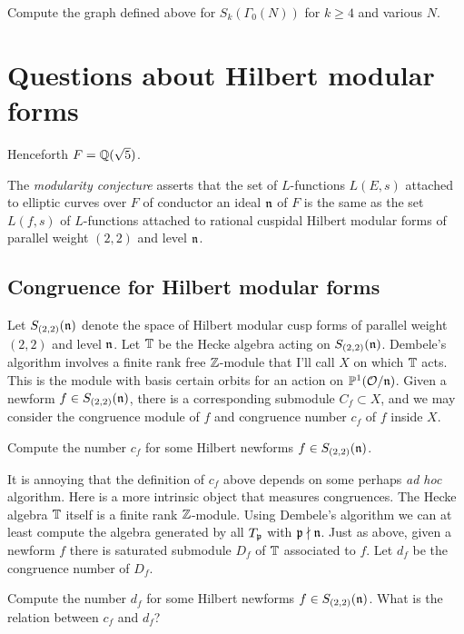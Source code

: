 \documentclass{article}
\begin{document}
\vspace{1em}
 Compute the graph defined above for
$S_k(\Gamma_0(N))$ for $k\geq 4$ and various $N$.


\section{Questions about Hilbert modular forms}

Henceforth $F=\mathbb{Q}(\sqrt{5})$.

The {\em modularity conjecture} asserts that the set of $L$-functions
$L(E,s)$ attached to elliptic curves over $F$ of conductor an ideal
$\mathfrak{n}$ of $F$ is the same as the set $L(f,s)$ of $L$-functions attached
to rational cuspidal Hilbert modular forms of parallel weight $(2,2)$
and level $\mathfrak{n}$.



\subsection{Congruence for Hilbert modular forms}

Let $S_{(2,2)}(\mathfrak{n})$ denote the space of Hilbert modular cusp forms of
parallel weight $(2,2)$ and level $\mathfrak{n}$.  Let $\mathbb{T}$ be the Hecke algebra
acting on $S_{(2,2)}(\mathfrak{n})$.   Dembele's algorithm involves a finite
rank free $\mathbb{Z}$-module that I'll call $X$ on which $\mathbb{T}$ acts. 
This is the module with basis certain orbits for an action on $\mathbb{P}^1(\mathcal{O}/\mathfrak{n})$.
Given a newform $f\in S_{(2,2)}(\mathfrak{n})$, there is a corresponding
submodule $C_f \subset X$, and we may consider the congruence module
of $f$ 
and congruence number $c_f$ of $f$ inside $X$.

\vspace{1em}
 Compute the number $c_f$ for some Hilbert
newforms $f \in S_{(2,2)}(\mathfrak{n})$.


It is annoying that the definition of $c_f$ above depends on some
perhaps {\em ad hoc} algorithm.  Here is a more intrinsic object that
measures congruences.  The Hecke algebra $\mathbb{T}$ itself is a finite rank
$\mathbb{Z}$-module.  Using Dembele's algorithm we can at least compute the
algebra generated by all $T_{\mathfrak{p}}$ with $\mathfrak{p}\nmid\mathfrak{n}$.  Just as above,
given a newform $f$ there is saturated submodule $D_f$ of $\mathbb{T}$
associated to $f$.    Let $d_f$ be the congruence number of $D_f$.

\vspace{1em}
 Compute the number $d_f$ for some
Hilbert newforms $f \in S_{(2,2)}(\mathfrak{n})$.  What is the relation between
$c_f$ and $d_f$?
\end{document}
